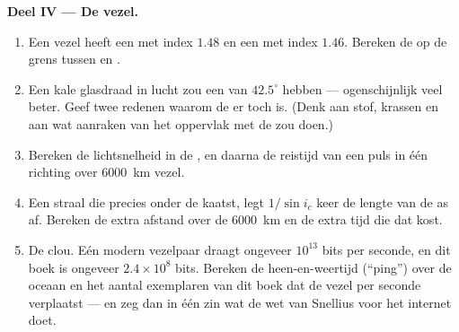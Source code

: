 \begin{problem}
\medskip
\noindent\textbf{Deel IV --- De vezel.}
\begin{enumerate}[resume]
  \item Een vezel heeft een  met index $1.48$ en een  met index
        $1.46$. Bereken de  op de grens tussen  en .
  \item Een kale glasdraad in lucht zou een  van $42.5^\circ$
        hebben --- ogenschijnlijk veel beter. Geef twee redenen waarom
        de  er toch is. (Denk aan stof, krassen en aan wat aanraken
        van het oppervlak met de  zou doen.)
  \item Bereken de lichtsnelheid in de , en daarna de reistijd van
        een puls in één richting over \qty{6000}{km} vezel.
  \item Een straal die precies onder de  kaatst, legt
        $1/\sin i_c$ keer de lengte van de as af. Bereken de extra
        afstand over de \qty{6000}{km} en de extra tijd die dat kost.
  \item De clou. Eén modern vezelpaar draagt ongeveer $10^{13}$ bits per
        seconde, en dit boek is ongeveer $2.4 \times 10^8$ bits. Bereken
        de heen-en-weertijd (``ping'') over de oceaan en het aantal
        exemplaren van dit boek dat de vezel per seconde verplaatst ---
        en zeg dan in één zin wat de wet van Snellius voor het internet
        doet.
\end{enumerate}
\end{problem}
